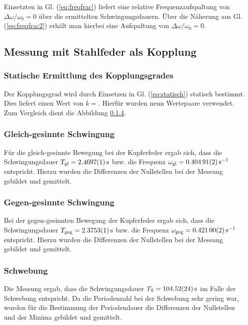 \documentclass[11pt,a4paper,titlepage, ngerman]{article}
\newcommand{\refeq}[1]{Gl. (\ref{eq:#1})}
\begin{document}
				Einsetzten in \refeq{freqfrac} liefert eine relative Frequenzaufspaltung von $\Delta\omega / \omega_0 = 0$ über die ermittelten Schwingungsdauern. Über die Näherung aus \refeq{freqfrac2} erhält man hierbei eine Aufspaltung von $\Delta\omega / \omega_0 = 0$.
				
		\subsection{Messung mit Stahlfeder als Kopplung}	
					
			\subsubsection{Statische Ermittlung des Kopplungsgrades}							
			
				Der Kopplungsgrad wird durch Einsetzen in \refeq{statisch} statisch bestimmt. Dies liefert einen Wert von $k=$. Hierfür wurden neun Wertepaare verwendet. Zum Vergleich dient die Abbildung \ref{}.
			
			\subsubsection{Gleich-gesinnte Schwingung}
			
				Für die gleich-gesinnte Bewegung bei der Kupferfeder ergab sich, dass die Schwingungsdauer $T_\text{gl} = \SI{2,4697 +- 0,0001}{\second}$ bzw. die Frequenz $\omega_\text{gl}  = \SI{0,40491 +- 0,00002}{\s^{-1}}$ entspricht. Hierzu wurden die Differenzen der Nullstellen bei der Messung gebildet und gemittelt. 
			
			\subsubsection{Gegen-gesinnte Schwingung}
			
				Bei der gegen-gesinnten Bewegung der Kupferfeder ergab sich, dass die Schwingungsdauer $T_\text{geg} = \SI{2,3753 +- 0,0001}{\second}$ bzw. die Frequenz $\omega_\text{geg}  = \SI{0,42100 +- 0,00002}{\s^{-1}}$ entspricht. Hierzu wurden die Differenzen der Nullstellen bei der Messung gebildet und gemittelt. 
			
			\subsubsection{Schwebung}
			
				Die Messung ergab, dass die Schwingungsdauer $T_\text{S} = \SI{104,52 +- 0,24}{\second}$ im Falle der Schwebung entspricht.  Da die Periodenzahl bei der Schwebung sehr gering war, wurden für die Bestimmung der Periodendauer die Differenzen der Nullstellen und der Minima gebildet und gemittelt.
			
\end{document}
